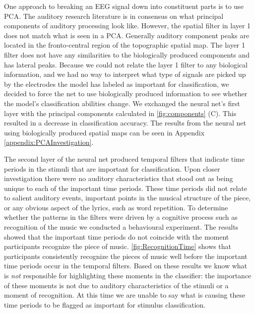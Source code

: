 One approach to breaking an EEG signal down into constituent parts is to use \ac{PCA}.
The auditory research literature is in consensus on what principal components of auditory processing look like.
However, the spatial filter in layer 1 does not match what is seen in a \ac{PCA}. 
Generally auditory component peaks are located in the fronto-central region of the topographic spatial map. 
The layer 1 filter does not have any similarities to the biologically produced components and has lateral peaks. 
Because we could not relate the layer 1 filter to any biological information, and we had no way to interpret what type of signals are picked up by the electrodes the model has labeled as important for classification, we decided to force the net to use biologically produced information to see whether the model's classification abilities change. 
We exchanged the neural net's first layer with the principal components calculated in \autoref{fig:components} (C). 
This resulted in a decrease in classification accuracy. The results from the neural net using biologically produced spatial maps can be seen in Appendix \ref{appendix:PCAInvestigation}.

The second layer of the neural net produced temporal filters that indicate time periods in the stimuli that are important for classification. 
Upon closer investigation there were no auditory characteristics that stood out as being unique to each of the important time periods.
These time periods did not relate to salient auditory events, important points in the musical structure of the piece, or any obvious aspect of the lyrics, such as word repetition. 
To determine whether the patterns in the filters were driven by a cognitive process such as recognition of the music we conducted a behavioural experiment.
The results showed that the important time periods do not coincide with the moment participants recognize the piece of music. 
\autoref{fig:RecognitionTime} shows that participants consistently recognize the pieces of music well before the important time periods occur in the temporal filters. 
Based on these results we know what is \emph{not} responsible for highlighting these moments in the classifier: the importance of these moments is not due to auditory characteristics of the stimuli or a moment of recognition.
At this time we are unable to say what is causing these time periods to be flagged as important for stimulus classification. 

